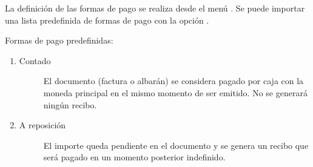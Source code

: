 La definición de las formas de pago se realiza desde el menú . Se puede importar una lista predefinida de formas de pago con la opción .

Formas de pago predefinidas:
\begin{enumerate}
 \item 
  \begin{description}
  \item [Contado] El documento (factura o albarán) se considera pagado por caja con la moneda principal en el mismo momento de ser emitido. No se generará ningún recibo.
  \end{description}
 \item
  \begin{description}
  \item [A reposición] El importe queda pendiente en el documento y se genera un recibo que será pagado en un momento posterior indefinido.
  \end{description}
\end{enumerate}

